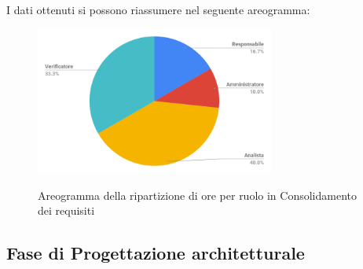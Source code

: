 \pagebreak
I dati ottenuti si possono riassumere nel seguente areogramma:
\begin{figure}[H] 
			\centering 
				\includegraphics[width=0.7\textwidth]{res/images/areogramma_consolidamento.png}\\
				\caption{Areogramma della ripartizione di ore per ruolo in Consolidamento dei requisiti}
			\label{AreogrammaConsolidaemnto}
\end{figure}

\subsection{Fase di Progettazione architetturale}
